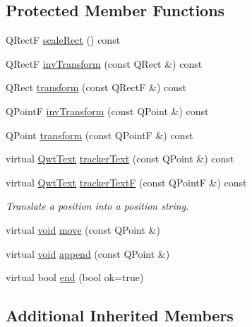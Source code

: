 \subsection*{Protected Member Functions}
\begin{DoxyCompactItemize}
\item 
Q\-Rect\-F \hyperlink{class_qwt_plot_picker_a6becfde9ef447128a55c0675bf1c1524}{scale\-Rect} () const 
\item 
Q\-Rect\-F \hyperlink{class_qwt_plot_picker_a259fb95f14eef08b24ba454d9b51d084}{inv\-Transform} (const Q\-Rect \&) const 
\item 
Q\-Rect \hyperlink{class_qwt_plot_picker_a4da9fc86484af7fc12565ad1bb6df24b}{transform} (const Q\-Rect\-F \&) const 
\item 
Q\-Point\-F \hyperlink{class_qwt_plot_picker_a0e02acfa2bed42ab691bc0a50d39727b}{inv\-Transform} (const Q\-Point \&) const 
\item 
Q\-Point \hyperlink{class_qwt_plot_picker_a800f6eb68661f26caba0ea4688e73e94}{transform} (const Q\-Point\-F \&) const 
\item 
virtual \hyperlink{class_qwt_text}{Qwt\-Text} \hyperlink{class_qwt_plot_picker_a7a85e6d7a45e5e480db670bb5f9a9b72}{tracker\-Text} (const Q\-Point \&) const 
\item 
virtual \hyperlink{class_qwt_text}{Qwt\-Text} \hyperlink{class_qwt_plot_picker_aceebd0c9f95da689a3045c3ccd23aa38}{tracker\-Text\-F} (const Q\-Point\-F \&) const 
\begin{DoxyCompactList}\small\item\em Translate a position into a position string. \end{DoxyCompactList}\item 
virtual \hyperlink{group___u_a_v_objects_plugin_ga444cf2ff3f0ecbe028adce838d373f5c}{void} \hyperlink{class_qwt_plot_picker_a7a979d23cd4d398e309409e76635bcf4}{move} (const Q\-Point \&)
\item 
virtual \hyperlink{group___u_a_v_objects_plugin_ga444cf2ff3f0ecbe028adce838d373f5c}{void} \hyperlink{class_qwt_plot_picker_a86a68e8ea235b9514084b729c75803ea}{append} (const Q\-Point \&)
\item 
virtual bool \hyperlink{class_qwt_plot_picker_a9fceb663542b6f9b0a358e9419406423}{end} (bool ok=true)
\end{DoxyCompactItemize}
\subsection*{Additional Inherited Members}


